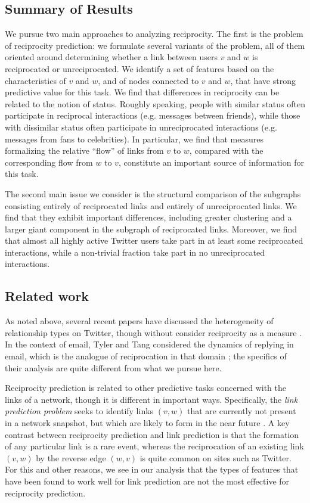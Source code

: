 \documentclass[conference]{IEEEtran}
\begin{document}
\subsection{Summary of Results}

We pursue two main approaches to analyzing reciprocity.
The first is the problem of reciprocity prediction:
we formulate several variants of the problem, all of them
oriented around determining whether a link between users $v$ and $w$
is reciprocated or unreciprocated.
We identify a set of features based on the characteristics of $v$ and $w$,
and of nodes connected to $v$ and $w$, that have strong predictive
value for this task.
We find that differences in reciprocity can be related to the 
notion of status.
Roughly speaking, people with similar status often participate in reciprocal
interactions (e.g. messages between friends), while those with
dissimilar status often participate in unreciprocated interactions (e.g.
messages from fans to celebrities).
In particular, we find that measures formalizing the 
relative ``flow'' of links from $v$ to $w$,
compared with the corresponding flow from $w$ to $v$, constitute
an important source of information for this task.

The second main issue we consider is the structural comparison
of the subgraphs consisting entirely of reciprocated links and
entirely of unreciprocated links.
We find that they exhibit important differences, including 
greater clustering and a larger giant component in the
subgraph of reciprocated links.
Moreover, we find that almost all highly active Twitter users
take part in at least some reciprocated interactions, 
while a non-trivial fraction take part in no unreciprocated interactions.

\subsection{Related work}

As noted above, several recent papers have discussed the 
heterogeneity of relationship types on Twitter,
though without consider reciprocity as a measure
\cite{kwak-what-is-twitter,romero-directed-closure}.
In the context of email, Tyler and Tang considered the dynamics
of replying in email, which is the analogue of reciprocation
in that domain \cite{Tyler:2003tq}; the specifics of their
analysis are quite different from what we pursue here.

Reciprocity prediction is related to other predictive tasks
concerned with the links of a network, though it is different in
important ways.
Specifically, the {\em link prediction problem} seeks to identify
links $(v,w)$ that are currently not present in a network snapshot,
but which are likely to form in the near future
\cite{liben-nowell-link-pred}.
A key contrast between reciprocity prediction and link prediction
is that the formation of any particular link is a rare event,
whereas the reciprocation of an existing link $(v,w)$ by
the reverse edge $(w,v)$ is quite common on sites such as Twitter.
For this and other reasons, we see in our analysis that the
types of features that have been found to work well for link 
prediction are not the most effective for reciprocity prediction.
\end{document}
